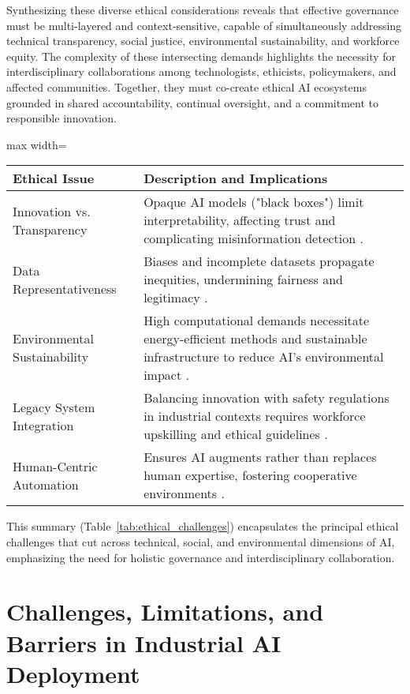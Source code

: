 \documentclass[sigconf]{acmart}
\begin{document}
Synthesizing these diverse ethical considerations reveals that effective governance must be multi-layered and context-sensitive, capable of simultaneously addressing technical transparency, social justice, environmental sustainability, and workforce equity. The complexity of these intersecting demands highlights the necessity for interdisciplinary collaborations among technologists, ethicists, policymakers, and affected communities. Together, they must co-create ethical AI ecosystems grounded in shared accountability, continual oversight, and a commitment to responsible innovation.

\begin{table*}[htbp]
\centering
\caption{Summary of Key Cross-Cutting Ethical Challenges in AI Development and Deployment}
\label{tab:ethical_challenges}
\begin{adjustbox}{max width=\textwidth}
\begin{tabular}{ll}
\toprule
\textbf{Ethical Issue} & \textbf{Description and Implications} \\
\bottomrule
Innovation vs. Transparency & Opaque AI models ("black boxes") limit interpretability, affecting trust and complicating misinformation detection \cite{ref7,ref8}. \\
Data Representativeness & Biases and incomplete datasets propagate inequities, undermining fairness and legitimacy \cite{ref37,ref20}. \\
Environmental Sustainability & High computational demands necessitate energy-efficient methods and sustainable infrastructure to reduce AI's environmental impact \cite{ref19}. \\
Legacy System Integration & Balancing innovation with safety regulations in industrial contexts requires workforce upskilling and ethical guidelines \cite{ref11,ref12,ref38}. \\
Human-Centric Automation & Ensures AI augments rather than replaces human expertise, fostering cooperative environments \cite{ref2}. \\
\bottomrule
\end{tabular}
\end{adjustbox}
\end{table*}

This summary (Table~\ref{tab:ethical_challenges}) encapsulates the principal ethical challenges that cut across technical, social, and environmental dimensions of AI, emphasizing the need for holistic governance and interdisciplinary collaboration.

\section{Challenges, Limitations, and Barriers in Industrial AI Deployment}
\end{document}

